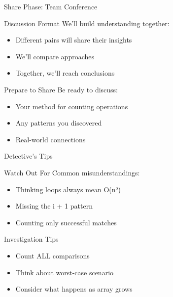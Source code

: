 \documentclass{beamer}
\begin{document}
\begin{frame}{Share Phase: Team Conference}
    \begin{block}{Discussion Format}
        We'll build understanding together:
        \begin{itemize}
            \item Different pairs will share their insights
            \item We'll compare approaches
            \item Together, we'll reach conclusions
        \end{itemize}
    \end{block}
    
    \begin{alertblock}{Prepare to Share}
        Be ready to discuss:
        \begin{itemize}
            \item Your method for counting operations
            \item Any patterns you discovered
            \item Real-world connections
        \end{itemize}
    \end{alertblock}
\end{frame}



\begin{frame}{Detective's Tips}
    \begin{block}{Watch Out For}
        Common misunderstandings:
        \begin{itemize}
            \item Thinking loops always mean O(n²)
            \item Missing the i + 1 pattern
            \item Counting only successful matches
        \end{itemize}
    \end{block}
    
    \begin{alertblock}{Investigation Tips}
        \begin{itemize}
            \item Count ALL comparisons
            \item Think about worst-case scenario
            \item Consider what happens as array grows
        \end{itemize}
    \end{alertblock}
\end{frame}
\end{document}
